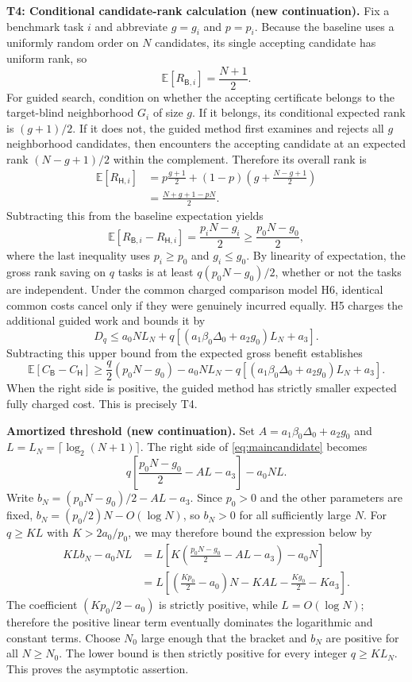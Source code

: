 \medskip\noindent\textbf{T4: Conditional candidate-rank calculation (new continuation).}
Fix a benchmark task $i$ and abbreviate $g=g_i$ and $p=p_i$. Because the baseline
uses a uniformly random order on $N$ candidates, its single accepting candidate has
uniform rank, so
\[
\mathbb E[R_{\mathsf B,i}]=\frac{N+1}{2}.
\]
For guided search, condition on whether the accepting certificate belongs to the target-blind
neighborhood $G_i$ of size $g$. If it belongs, its conditional expected rank is $(g+1)/2$.
If it does not, the guided method first examines and rejects all $g$ neighborhood
candidates, then encounters the accepting candidate at an expected rank $(N-g+1)/2$
within the complement. Therefore its overall rank is
\begin{align*}
\mathbb E[R_{\mathsf H,i}]
 &=p\frac{g+1}{2}+(1-p)\left(g+\frac{N-g+1}{2}\right)\\
 &=\frac{N+g+1-pN}{2}.
\end{align*}
Subtracting this from the baseline expectation yields
\[
\mathbb E[R_{\mathsf B,i}-R_{\mathsf H,i}]
=\frac{p_iN-g_i}{2}\ge\frac{p_0N-g_0}{2},
\]
where the last inequality uses $p_i\ge p_0$ and $g_i\le g_0$.
By linearity of expectation, the gross rank saving on $q$ tasks is at least
$q(p_0N-g_0)/2$, whether or not the tasks are independent.
Under the common charged comparison model H6, identical common costs cancel only
if they were genuinely incurred equally. H5 charges the additional guided work and bounds it by
\[
D_q\le a_0NL_N+q[(a_1\beta_0\Delta_0+a_2g_0)L_N+a_3].
\]
Subtracting this upper bound from the expected gross benefit establishes
\begin{equation}\label{eq:maincandidate}
\mathbb E[C_{\mathsf B}-C_{\mathsf H}]
\ge\frac q2(p_0N-g_0)-a_0NL_N
-q[(a_1\beta_0\Delta_0+a_2g_0)L_N+a_3].
\end{equation}
When the right side is positive, the guided method has strictly smaller expected
fully charged cost. This is precisely T4.

\medskip\noindent\textbf{Amortized threshold (new continuation).}
Set $A=a_1\beta_0\Delta_0+a_2g_0$ and $L=L_N=\lceil\log_2(N+1)\rceil$.
The right side of \eqref{eq:maincandidate} becomes
\[
q\left[\frac{p_0N-g_0}{2}-AL-a_3\right]-a_0NL.
\]
Write $b_N=(p_0N-g_0)/2-AL-a_3$. Since $p_0>0$ and the other parameters are fixed,
$b_N=(p_0/2)N-O(\log N)$, so $b_N>0$ for all sufficiently large $N$.
For $q\ge KL$ with $K>2a_0/p_0$, we may therefore bound the expression below by
\begin{align*}
KLb_N-a_0NL
&=L\left[K\left(\frac{p_0N-g_0}{2}-AL-a_3\right)-a_0N\right]\\
&=L\left[\left(\frac{Kp_0}{2}-a_0\right)N
-KAL-\frac{Kg_0}{2}-Ka_3\right].
\end{align*}
The coefficient $(Kp_0/2-a_0)$ is strictly positive, while $L=O(\log N)$;
therefore the positive linear term eventually dominates the logarithmic and
constant terms. Choose $N_0$ large enough that the bracket and $b_N$
are positive for all $N\ge N_0$. The lower bound is then strictly positive
for every integer $q\ge KL_N$. This proves the asymptotic assertion. \qedhere
